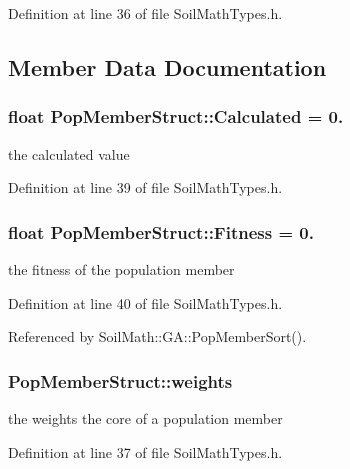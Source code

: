 Definition at line 36 of file Soil\+Math\+Types.\+h.



\subsection{Member Data Documentation}
\hypertarget{struct_pop_member_struct_a8e76eeb476bc89f765b1d872d399fe0c}{}
\subsubsection[{Calculated}]{\setlength{\rightskip}{0pt plus 5cm}float Pop\+Member\+Struct\+::\+Calculated = 0.}\label{struct_pop_member_struct_a8e76eeb476bc89f765b1d872d399fe0c}
the calculated value 

Definition at line 39 of file Soil\+Math\+Types.\+h.

\hypertarget{struct_pop_member_struct_a750ec8010731e3e2a876051475c31b14}{}
\subsubsection[{Fitness}]{\setlength{\rightskip}{0pt plus 5cm}float Pop\+Member\+Struct\+::\+Fitness = 0.}\label{struct_pop_member_struct_a750ec8010731e3e2a876051475c31b14}
the fitness of the population member 

Definition at line 40 of file Soil\+Math\+Types.\+h.



Referenced by Soil\+Math\+::\+G\+A\+::\+Pop\+Member\+Sort().

\hypertarget{struct_pop_member_struct_aeba960170ef60a906c730cc24cd90367}{}
\subsubsection[{weights}]{ Pop\+Member\+Struct\+::weights}\label{struct_pop_member_struct_aeba960170ef60a906c730cc24cd90367}
the weights the core of a population member 

Definition at line 37 of file Soil\+Math\+Types.\+h.




